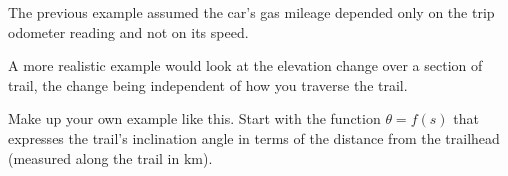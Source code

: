 \documentclass{ximera}
\begin{document}
\begin{example} \label{ESdfdrhmmn}
The previous example assumed the car's gas mileage depended only on the trip odometer reading and not on its speed.

A more realistic example would look at the elevation change over a section of trail, the change being independent of how you traverse the trail.

Make up your own example like this. Start with the function $\theta = f(s)$ that expresses the trail's inclination angle in terms of the distance from the trailhead (measured along the trail in km). 
\end{example}
\end{document}
